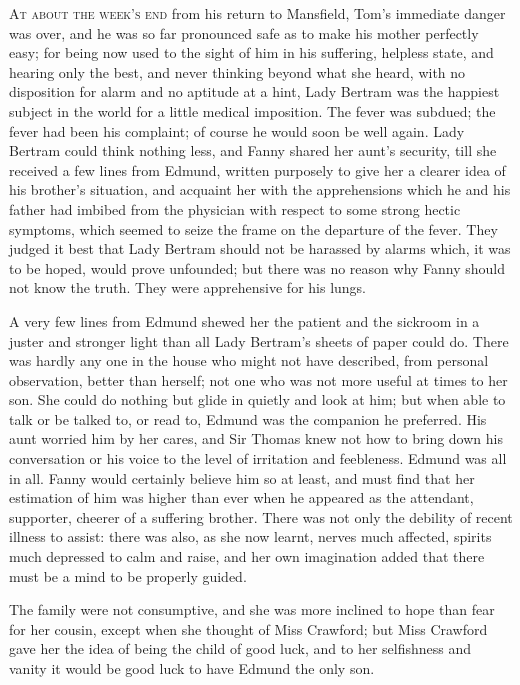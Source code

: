 \documentclass{article}
\newcommand{\gintro}[1]{\textcolor{gcolor}{\textsc{#1}}}
\begin{document}
\gintro{At about the week's end} from his return to Mansfield,
Tom's immediate danger was over, and he was so far
pronounced safe as to make his mother perfectly easy;
for being now used to the sight of him in his suffering,
helpless state, and hearing only the best, and never thinking
beyond what she heard, with no disposition for alarm
and no aptitude at a hint, Lady Bertram was the happiest
subject in the world for a little medical imposition.
The fever was subdued; the fever had been his complaint;
of course he would soon be well again.  Lady Bertram could
think nothing less, and Fanny shared her aunt's security,
till she received a few lines from Edmund, written purposely
to give her a clearer idea of his brother's situation,
and acquaint her with the apprehensions which he and his
father had imbibed from the physician with respect to some
strong hectic symptoms, which seemed to seize the frame
on the departure of the fever.  They judged it best
that Lady Bertram should not be harassed by alarms which,
it was to be hoped, would prove unfounded; but there was
no reason why Fanny should not know the truth.  They were
apprehensive for his lungs.

A very few lines from Edmund shewed her the patient
and the sickroom in a juster and stronger light than
all Lady Bertram's sheets of paper could do.  There was
hardly any one in the house who might not have described,
from personal observation, better than herself;
not one who was not more useful at times to her son.
She could do nothing but glide in quietly and look at him;
but when able to talk or be talked to, or read to,
Edmund was the companion he preferred.  His aunt worried
him by her cares, and Sir Thomas knew not how to bring down
his conversation or his voice to the level of irritation
and feebleness.  Edmund was all in all.  Fanny would
certainly believe him so at least, and must find that her
estimation of him was higher than ever when he appeared
as the attendant, supporter, cheerer of a suffering brother.
There was not only the debility of recent illness to assist:
there was also, as she now learnt, nerves much affected,
spirits much depressed to calm and raise, and her own
imagination added that there must be a mind to be
properly guided.

The family were not consumptive, and she was more inclined
to hope than fear for her cousin, except when she thought
of Miss Crawford; but Miss Crawford gave her the idea
of being the child of good luck, and to her selfishness
and vanity it would be good luck to have Edmund the only son.
\end{document}
